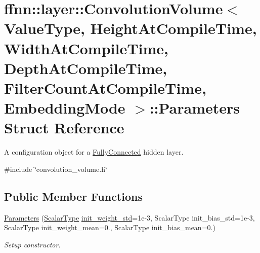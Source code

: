 \hypertarget{structffnn_1_1layer_1_1_convolution_volume_1_1_parameters}{\section{ffnn\-:\-:layer\-:\-:Convolution\-Volume$<$ Value\-Type, Height\-At\-Compile\-Time, Width\-At\-Compile\-Time, Depth\-At\-Compile\-Time, Filter\-Count\-At\-Compile\-Time, Embedding\-Mode $>$\-:\-:Parameters Struct Reference}
\label{structffnn_1_1layer_1_1_convolution_volume_1_1_parameters}
}


A configuration object for a \hyperlink{classffnn_1_1layer_1_1_fully_connected}{Fully\-Connected} hidden layer.  




{\ttfamily \#include \char`\"{}convolution\-\_\-volume.\-h\char`\"{}}

\subsection*{Public Member Functions}
\begin{DoxyCompactItemize}
\item 
\hyperlink{structffnn_1_1layer_1_1_convolution_volume_1_1_parameters_a4ab81f22691d953e2fca2d1206cf68b5}{Parameters} (\hyperlink{classffnn_1_1layer_1_1_convolution_volume_aa9435c5ef8e0d2aa5cf57d2a2758a615}{Scalar\-Type} \hyperlink{structffnn_1_1layer_1_1_convolution_volume_1_1_parameters_a1e9fca459e2666e545cae3eaa809a7a7}{init\-\_\-weight\-\_\-std}=1e-\/3, Scalar\-Type init\-\_\-bias\-\_\-std=1e-\/3, Scalar\-Type init\-\_\-weight\-\_\-mean=0., Scalar\-Type init\-\_\-bias\-\_\-mean=0.)
\begin{DoxyCompactList}\small\item\em Setup constructor. \end{DoxyCompactList}\end{DoxyCompactItemize}
